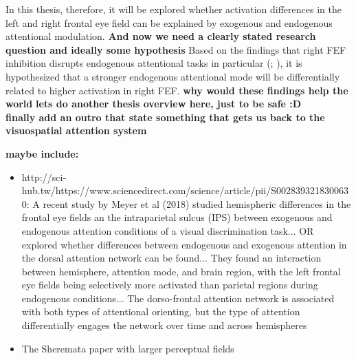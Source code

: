 \documentclass[a4paper, 12pt]{scrreprt}
\begin{document}
In this thesis, therefore, it will be explored whether activation differences in the left and right frontal eye field can be explained by exogenous and endogenous attentional modulation. \textbf{And now we need a clearly stated research question and ideally some hypothesis} Based on the findings that right FEF inhibition disrupts endogenous attentional tasks in particular (\cite{muggleton2003human}; \cite{grosbras2002transcranial}), it is hypothesized that a stronger endogenous attentional mode will be differentially related to higher activation in right FEF. \textbf{why would these findings help the world}\newline
\textbf{lets do another thesis overview here, just to be safe :D} \\
\textbf{finally add an outro that state something that gets us back to the visuospatial attention system}

\textbf{maybe include:}
\begin{itemize}
	\item http://sci-hub.tw/https://www.sciencedirect.com/science/article/pii/S0028393218300630: A recent study by Meyer et al (2018) studied hemispheric differences in the frontal eye fields an the intraparietal sulcus (IPS) between exogenous and endogenous attention conditions of a visual discrimination task... OR explored whether differences between endogenous and exogenous attention in the dorsal attention network can be found... They found an interaction between hemisphere, attention mode, and brain region, with the left frontal eye fields being selectively more activated than parietal regions during endogenous conditions... The dorso-frontal attention network is associated with both types of attentional orienting, but the type of attention differentially engages the network over time and across hemispheres
	\item The Sheremata paper with larger perceptual fields
\end{itemize}
\end{document}
